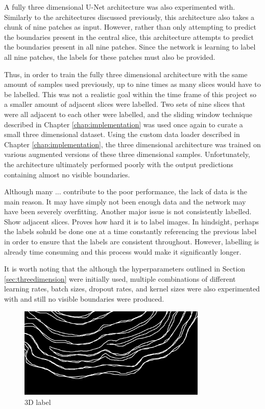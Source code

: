 A fully three dimensional U-Net architecture was also experimented with. Similarly to the architectures discussed previously, this architecture also takes a chunk of nine patches as input. However, rather than only attempting to predict the boundaries present in the central slice, this architecture attempts to predict the boundaries present in all nine patches. Since the network is learning to label all nine patches, the labels for these patches must also be provided.

Thus, in order to train the fully three dimensional architecture with the same amount of samples used previously, up to nine times as many slices would have to be labelled. This was not a realistic goal within the time frame of this project so a smaller amount of adjacent slices were labelled. Two sets of nine slices that were all adjacent to each other were labelled, and the sliding window technique described in Chapter \ref{chap:implementation} was used once again to curate a small three dimensional dataset. Using the custom data loader described in Chapter \ref{chap:implementation}, the three dimensional architecture was trained on various augmented versions of these three dimensional samples. Unfortunately, the architecture ultimately performed poorly with the output predictions containing almost no visible boundaries.

Although many ... contribute to the poor performance, the lack of data is the main reason. It may have simply not been enough data and the network may have been severely overfitting. Another major issue is not consistently labelled. Show adjacent slices. Proves how hard it is to label images. In hindsight, perhaps the labels sohuld be done one at a time constantly referencing the previous label in order to ensure that the labels are consistent throughout. However, labelling is already time consuming and this process would make it significantly longer.

It is worth noting that the although the hyperparameters outlined in Section \ref{sec:threedimension} were initially used, multiple combinations of different learning rates, batch sizes, dropout rates, and kernel sizes were also experimented with and still no visible boundaries were produced.

\begin{figure}[t]
    \centering
    \includegraphics[width=0.8\textwidth]{images/3D-label-example.png}
    \caption{3D label}
    \label{fig:3dlabel}
\end{figure}

